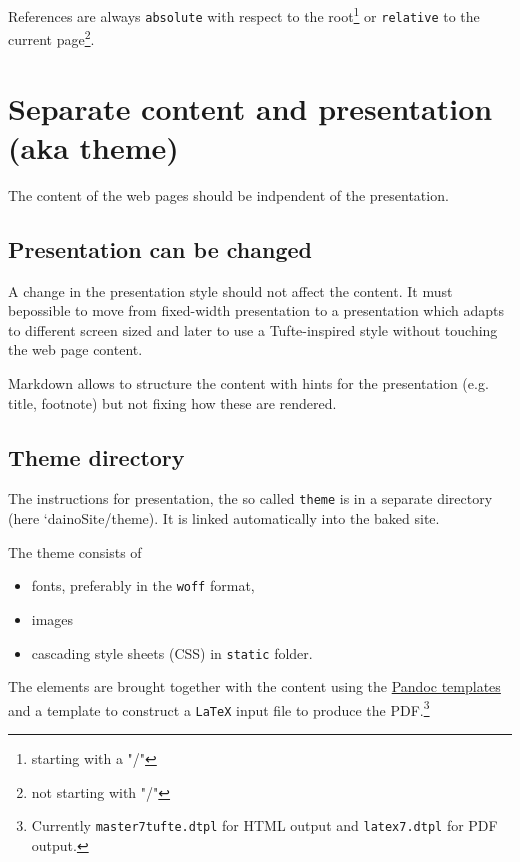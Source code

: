 \documentclass{tufte-book}
\begin{document}
References are always \texttt{absolute} with respect to the
root\footnote{starting with a "/"} or \texttt{relative} to the current
page\footnote{not starting with "/"}.

\chapter{Separate content and presentation (aka theme)}
\begin{mdframed}The content of the web pages should be indpendent of the presentation.\end{mdframed}
\hypertarget{presentation-can-be-changed}{%
	\section{Presentation can be
		changed}\label{presentation-can-be-changed}}

A change in the presentation style should not affect the content. It
must bepossible to move from fixed-width presentation to a presentation
which adapts to different screen sized and later to use a Tufte-inspired
style without touching the web page content.

Markdown allows to structure the content with hints for the presentation
(e.g. title, footnote) but not fixing how these are rendered.

\hypertarget{theme-directory}{%
	\section{Theme directory}\label{theme-directory}}

The instructions for presentation, the so called \texttt{theme} is in a
separate directory (here `dainoSite/theme). It is linked automatically
into the baked site.

The theme consists of

\begin{itemize}
	\item
	fonts, preferably in the \texttt{woff} format,
	\item
	images
	\item
	cascading style sheets (CSS) in \texttt{static} folder.
\end{itemize}

The elements are brought together with the content using the
\href{https://hackage.haskell.org/package/pandoc-3.1.1/docs/Text-Pandoc-Templates.html}{Pandoc
	templates} and a template to construct a \texttt{LaTeX} input file to
produce the PDF.\footnote{Currently \texttt{master7tufte.dtpl} for HTML
	output and \texttt{latex7.dtpl} for PDF output.}
\end{document}
